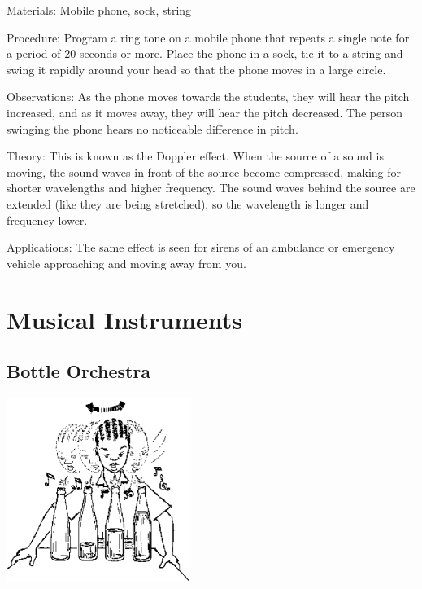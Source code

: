 \begin{multicols}{2}
\begin{description*}
\item[Materials:]{Mobile phone, sock, string}
\item[Procedure:]{Program a ring tone on a mobile phone that repeats a single note for a period of 20 seconds or more. Place the phone in a sock, tie it to a string and swing it rapidly around your head so that the phone moves in a large circle.}
\item[Observations:]{As the phone moves towards the students, they will hear the pitch increased, and as it moves away, they will hear the pitch decreased. The person swinging the phone hears no noticeable difference in pitch.}
\item[Theory:]{This is known as the Doppler effect. When the source of a sound is moving, the sound waves in front of the source become compressed, making for shorter wavelengths and higher frequency. The sound waves behind the source are extended (like they are being stretched), so the wavelength is longer and frequency lower.}
\item[Applications:]{The same effect is seen for sirens of an ambulance or emergency vehicle approaching and moving away from you.}
\end{description*}


\section*{Musical Instruments}  


\subsection{Bottle Orchestra}

\begin{center}
\includegraphics[width=0.45\textwidth]{./img/source/bottle-orchestra.png}
\end{center}


\end{multicols}
